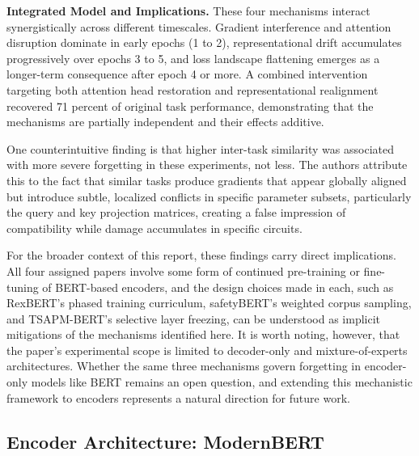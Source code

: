 \documentclass[a4paper,12pt]{article}
\begin{document}
\textbf{Integrated Model and Implications.} These four mechanisms interact
synergistically across different timescales. Gradient interference and attention
disruption dominate in early epochs (1 to 2), representational drift accumulates
progressively over epochs 3 to 5, and loss landscape flattening emerges as a
longer-term consequence after epoch 4 or more. A combined intervention targeting
both attention head restoration and representational realignment recovered 71 percent
of original task performance, demonstrating that the mechanisms are partially
independent and their effects additive.

One counterintuitive finding is that higher inter-task similarity was associated with
more severe forgetting in these experiments, not less. The authors attribute this to
the fact that similar tasks produce gradients that appear globally aligned but
introduce subtle, localized conflicts in specific parameter subsets, particularly the
query and key projection matrices, creating a false impression of compatibility while
damage accumulates in specific circuits.

For the broader context of this report, these findings carry direct implications.
All four assigned papers involve some form of continued pre-training or fine-tuning
of BERT-based encoders, and the design choices made in each, such as RexBERT's
phased training curriculum, safetyBERT's weighted corpus sampling, and TSAPM-BERT's
selective layer freezing, can be understood as implicit mitigations of the mechanisms
identified here. It is worth noting, however, that the paper's experimental scope
is limited to decoder-only and mixture-of-experts architectures. Whether the same
three mechanisms govern forgetting in encoder-only models like BERT remains an open
question, and extending this mechanistic framework to encoders represents a natural
direction for future work.

\subsection{Encoder Architecture: ModernBERT}
\end{document}
